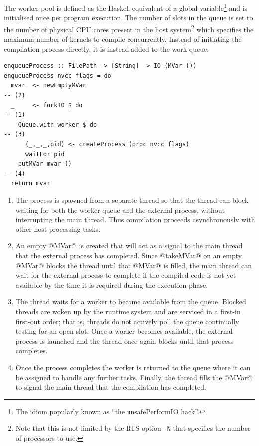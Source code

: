 The worker pool is defined as the Haskell equivalent of a global
variable\footnote{The idiom popularly known as ``the unsafePerformIO hack''.}
and is initialised once per program execution. The number of slots in the queue
is set to the number of physical CPU cores present in the host
system\footnote{Note that this is not limited by the RTS option \texttt{-N} that
specifies the number of processors to use.} which specifies the maximum number
of kernels to compile concurrently. Instead of initiating the compilation
process directly, it is instead added to the work queue:
%
\begin{lstlisting}[style=haskell,firstnumber=last]
enqueueProcess :: FilePath -> [String] -> IO (MVar ())
enqueueProcess nvcc flags = do
  mvar  <- newEmptyMVar                                                            -- (2)
  _     <- forkIO $ do                                                             -- (1)
    Queue.with worker $ do                                                         -- (3)
      (_,_,_,pid) <- createProcess (proc nvcc flags)
      waitFor pid
    putMVar mvar ()                                                                -- (4)
  return mvar
\end{lstlisting}
%
\begin{enumerate}
\item The process is spawned from a separate thread so that the thread can block
    waiting for both the worker queue and the external process, without
    interrupting the main thread. Thus compilation proceeds asynchronously with
    other host processing tasks.

\item An empty @MVar@ is created that will act as a signal to the main
    thread that the external process has completed. Since @takeMVar@ on an
    empty @MVar@ blocks the thread until that @MVar@ is filled, the main thread
    can wait for the external process to complete if the compiled code is not
    yet available by the time it is required during the execution phase.

\item The thread waits for a worker to become available from the queue. Blocked
    threads are woken up by the runtime system and are serviced in a first-in
    first-out order; that is, threads do not actively poll the queue continually
    testing for an open slot. Once a worker becomes available, the external
    process is launched and the thread once again blocks until that process
    completes.

\item Once the process completes the worker is returned to the queue where it
    can be assigned to handle any further tasks. Finally, the thread fills the
    @MVar@ to signal the main thread that the compilation has completed.
\end{enumerate}

